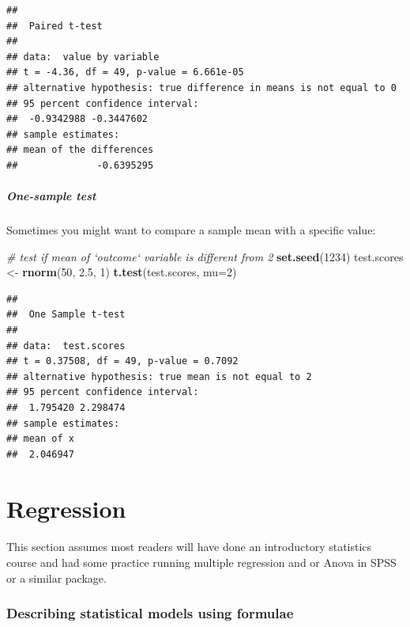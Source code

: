 \documentclass[]{article}
\newenvironment{Shaded}{\begin{snugshade}}{\end{snugshade}}
\newcommand{\KeywordTok}[1]{\textcolor[rgb]{0.13,0.29,0.53}{\textbf{#1}}}
\newcommand{\DataTypeTok}[1]{\textcolor[rgb]{0.13,0.29,0.53}{#1}}
\newcommand{\DecValTok}[1]{\textcolor[rgb]{0.00,0.00,0.81}{#1}}
\newcommand{\FloatTok}[1]{\textcolor[rgb]{0.00,0.00,0.81}{#1}}
\newcommand{\StringTok}[1]{\textcolor[rgb]{0.31,0.60,0.02}{#1}}
\newcommand{\CommentTok}[1]{\textcolor[rgb]{0.56,0.35,0.01}{\textit{#1}}}
\newcommand{\NormalTok}[1]{#1}
\let\oldparagraph\paragraph
\renewcommand{\paragraph}[1]{\oldparagraph{#1}\mbox{}}
\let\oldsubparagraph\subparagraph
\renewcommand{\subparagraph}[1]{\oldsubparagraph{#1}\mbox{}}
\theoremstyle{definition}
\theoremstyle{definition}
\theoremstyle{definition}
\theoremstyle{remark}
\begin{document}
\begin{verbatim}
## 
##  Paired t-test
## 
## data:  value by variable
## t = -4.36, df = 49, p-value = 6.661e-05
## alternative hypothesis: true difference in means is not equal to 0
## 95 percent confidence interval:
##  -0.9342988 -0.3447602
## sample estimates:
## mean of the differences 
##              -0.6395295
\end{verbatim}

\subparagraph{One-sample test}\label{one-sample-test}

Sometimes you might want to compare a sample mean with a specific value:

\begin{Shaded}
\begin{Highlighting}[]
\CommentTok{# test if mean of `outcome` variable is different from 2}
\KeywordTok{set.seed}\NormalTok{(}\DecValTok{1234}\NormalTok{)}
\NormalTok{test.scores <-}\StringTok{ }\KeywordTok{rnorm}\NormalTok{(}\DecValTok{50}\NormalTok{, }\FloatTok{2.5}\NormalTok{, }\DecValTok{1}\NormalTok{)}
\KeywordTok{t.test}\NormalTok{(test.scores, }\DataTypeTok{mu=}\DecValTok{2}\NormalTok{)}
\end{Highlighting}
\end{Shaded}

\begin{verbatim}
## 
##  One Sample t-test
## 
## data:  test.scores
## t = 0.37508, df = 49, p-value = 0.7092
## alternative hypothesis: true mean is not equal to 2
## 95 percent confidence interval:
##  1.795420 2.298474
## sample estimates:
## mean of x 
##  2.046947
\end{verbatim}

\hypertarget{linear-models-simple}{\section{Regression}\label{linear-models-simple}}

\paragraph{}\label{section-13}

This section assumes most readers will have done an introductory
statistics course and had some practice running multiple regression and
or Anova in SPSS or a similar package.

\hypertarget{formulae}{\subsubsection*{Describing statistical models
using formulae}\label{formulae}}
\end{document}
